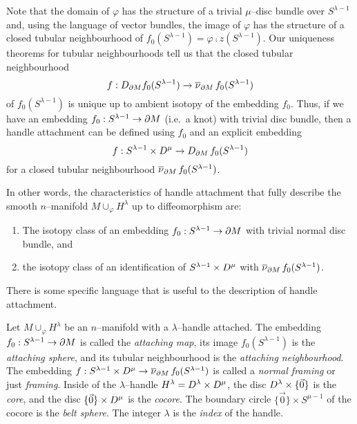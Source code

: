 Note that the domain of $\varphi$ has the structure of a trivial $\mu$--disc bundle over $S^{\lambda-1}$ and, using the language of vector bundles, the image of $\varphi$ has the structure of a closed tubular neighbourhood of $f_0(S^{\lambda-1})=\varphi\comp z(S^{\lambda-1})$.
Our uniqueness theorems for tubular neighbourhoods tell us that the closed tubular neighbourhood
\[
	f:D_{\partial M}f_0(S^{\lambda-1})\to\overline{\nu}_{\partial M}\,f_0(S^{\lambda-1})
\]
of $f_0(S^{\lambda-1})$ is unique up to ambient isotopy of the embedding $f_0$.
Thus, if we have an embedding $f_0:S^{\lambda-1}\to \partial M$ (i.e.\ a knot) with trivial disc bundle, then a handle attachment can be defined using $f_0$ and an explicit embedding 
\[
	f: S^{\lambda-1}\times D^\mu\to D_{\partial M}\,f_0(S^{\lambda-1})
\]
for a closed tubular neighbourhood $\overline{\nu}_{\partial M}\,f_0(S^{\lambda-1})$.

In other words, the characteristics of handle attachment that fully describe the smooth $n$--manifold $M\cup_\varphi H^\lambda$ up to diffeomorphism are:
\begin{enumerate}
	\item The isotopy class of an embedding $f_0:S^{\lambda-1}\to\partial M$ with trivial normal disc bundle, and 
	\item the isotopy class of an identification of $S^{\lambda-1}\times D^\mu$ with $\overline{\nu}_{\partial M}\,f_0(S^{\lambda-1})$.
\end{enumerate}

There is some specific language that is useful to the description of handle attachment.

\begin{defn}
	Let $M\cup_\varphi H^\lambda$ be an $n$--manifold with a $\lambda$--handle attached.
	The embedding $f_0:S^{\lambda-1}\to\partial M$ is called the \emph{attaching map}, its image $f_0(S^{\lambda-1})$ is the \emph{attaching sphere}, and its tubular neighbourhood is the \emph{attaching neighbourhood}.
	The embedding $f: S^{\lambda-1}\times D^\mu\to \overline{\nu}_{\partial M}\,f_0(S^{\lambda-1})$ is called a \emph{normal framing} or just \emph{framing}.
	Inside of the $\lambda$--handle $H^\lambda=D^\lambda\times D^\mu$, the disc $D^\lambda\times\{\vec{0}\}$ is the \emph{core}, and the disc $\{\vec{0}\}\times D^\mu$ is the \emph{cocore}.
	The boundary circle $\{\vec{0}\}\times S^{\mu-1}$ of the cocore is the \emph{belt sphere}.
	The integer $\lambda$ is the \emph{index} of the handle.
\end{defn}

